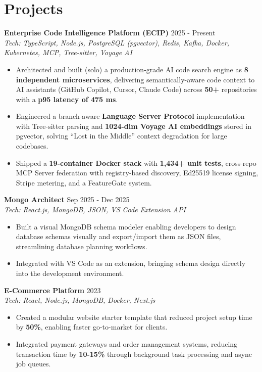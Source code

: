\documentclass[letterpaper,10pt]{article}
\newcommand{\projectheader}[3]{%
  \noindent\textbf{#1} \hfill #2 \\
  \textit{\small Tech: #3}\vspace{-2pt}
}
\begin{document}
\section{Projects}

\projectheader{Enterprise Code Intelligence Platform (ECIP)}{2025 - Present}{TypeScript, Node.js, PostgreSQL (pgvector), Redis, Kafka, Docker, Kubernetes, MCP, Tree-sitter, Voyage AI}
\begin{itemize}
  \item Architected and built (solo) a production-grade AI code search engine as \textbf{8 independent microservices}, delivering semantically-aware code context to AI assistants (GitHub Copilot, Cursor, Claude Code) across \textbf{50+} repositories with a \textbf{p95 latency of 475 ms}.
  \item Engineered a branch-aware \textbf{Language Server Protocol} implementation with Tree-sitter parsing and \textbf{1024-dim Voyage AI embeddings} stored in pgvector, solving ``Lost in the Middle'' context degradation for large codebases.
  \item Shipped a \textbf{19-container Docker stack} with \textbf{1,434+ unit tests}, cross-repo MCP Server federation with registry-based discovery, Ed25519 license signing, Stripe metering, and a FeatureGate system.
\end{itemize}

\projectheader{Mongo Architect}{Sep 2025 - Dec 2025}{React.js, MongoDB, JSON, VS Code Extension API}
\begin{itemize}
  \item Built a visual MongoDB schema modeler enabling developers to design database schemas visually and export/import them as JSON files, streamlining database planning workflows.
  \item Integrated with VS Code as an extension, bringing schema design directly into the development environment.
\end{itemize}

\projectheader{E-Commerce Platform}{2023}{React, Node.js, MongoDB, Docker, Next.js}
\begin{itemize}
  \item Created a modular website starter template that reduced project setup time by \textbf{50\%}, enabling faster go-to-market for clients.
  \item Integrated payment gateways and order management systems, reducing transaction time by \textbf{10-15\%} through background task processing and async job queues.
\end{itemize}
\end{document}
